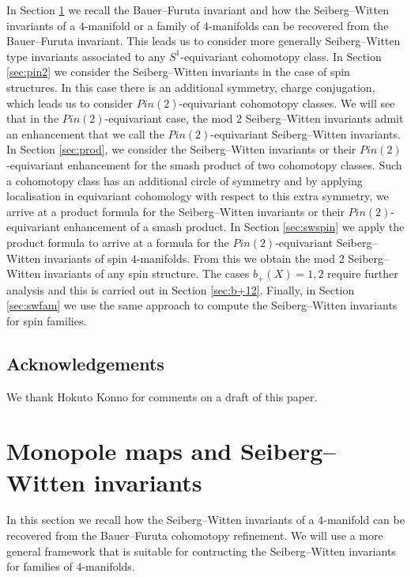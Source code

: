 \documentclass{amsart}
\theoremstyle{definition}
\theoremstyle{remark}
\numberwithin{equation}{section}
\begin{document}
In Section \ref{sec:swi} we recall the Bauer--Furuta invariant and how the Seiberg--Witten invariants of a $4$-manifold or a family of $4$-manifolds can be recovered from the Bauer--Furuta invariant. This leads us to consider more generally Seiberg--Witten type invariants associated to any $S^1$-equivariant cohomotopy class. In Section \ref{sec:pin2} we consider the Seiberg--Witten invariants in the case of spin structures. In this case there is an additional symmetry, charge conjugation, which leads us to consider $Pin(2)$-equivariant cohomotopy classes. We will see that in the $Pin(2)$-equivariant case, the mod $2$ Seiberg--Witten invariants admit an enhancement that we call the $Pin(2)$-equivariant Seiberg--Witten invariants. In Section \ref{sec:prod}, we consider the Seiberg--Witten invariants or their $Pin(2)$-equivariant enhancement for the smash product of two cohomotopy classes. Such a cohomotopy class has an additional circle of symmetry and by applying localisation in equivariant cohomology with respect to this extra symmetry, we arrive at a product formula for the Seiberg--Witten invariants or their $Pin(2)$-equivariant enhancement of a smash product. In Section \ref{sec:swspin} we apply the product formula to arrive at a formula for the $Pin(2)$-equivariant Seiberg--Witten invariants of spin $4$-manifolds. From this we obtain the mod $2$ Seiberg--Witten invariants of any spin structure. The cases $b_+(X) = 1,2$ require further analysis and this is carried out in Section \ref{sec:b+12}. Finally, in Section \ref{sec:swfam} we use the same approach to compute the Seiberg--Witten invariants for spin families.

\subsection{Acknowledgements}

We thank Hokuto Konno for comments on a draft of this paper.



\section{Monopole maps and Seiberg--Witten invariants}\label{sec:swi}

In this section we recall how the Seiberg--Witten invariants of a $4$-manifold can be recovered from the Bauer--Furuta cohomotopy refinement. We will use a more general framework that is suitable for contructing the Seiberg--Witten invariants for families of $4$-manifolds. 
\end{document}
